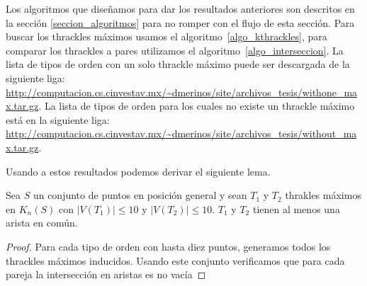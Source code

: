 Los algoritmos que diseñamos para dar los resultados anteriores son descritos
en la sección \ref{seccion_algoritmos} para no romper con el flujo de esta
sección. Para buscar los thrackles máximos usamos el
algoritmo~\ref{algo_kthrackles}, para comparar los thrackles a pares utilizamos
el algoritmo~\ref{algo_interseccion}. La lista de tipos de orden
con un solo thrackle máximo puede ser descargada de la siguiente liga:
\url{http://computacion.cs.cinvestav.mx/~dmerinos/site/archivos_tesis/withone_ma
x.tar.gz}.
La lista de tipos de orden para los cuales no existe un thrackle máximo
está en la siguiente liga:
\url{http://computacion.cs.cinvestav.mx/~dmerinos/site/archivos_tesis/without_ma
x.tar.gz}.

Usando a estos resultados podemos derivar el siguiente lema.
\begin{lemma}\label{lema:thdisjuntos}
  Sea $S$ un conjunto de puntos en posición general y sean $T_1$ y $T_2$ thrakles máximos en $K_n(S)$ con $|V(T_1)|\leq 10$
  y $|V(T_2)|\leq 10$. $T_1$ y $T_2$ tienen al menos una arista en común.
\end{lemma}
\begin{proof}
  Para cada tipo de orden con hasta diez puntos, generamos todos los thrackles
  máximos inducidos. Usando este conjunto verificamos que para cada pareja la intersección en aristas es no vacía
\end{proof}

